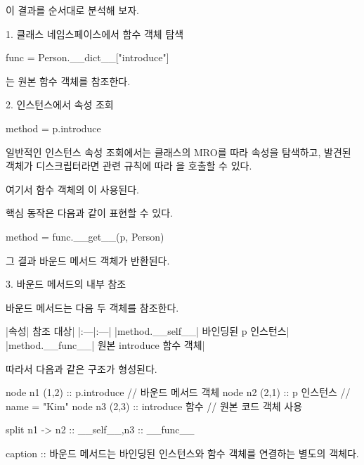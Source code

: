 이 결과를 순서대로 분석해 보자.

\begin{dhknote}
\begin{dhksmry}[centered]
1. 클래스 네임스페이스에서 함수 객체 탐색
\end{dhksmry}
\end{dhknote}

\begin{dhkcode}
func = Person.__dict__["introduce"]
\end{dhkcode}

는 원본 함수 객체를 참조한다.

\begin{dhknote}
\begin{dhksmry}[centered]
2. 인스턴스에서 속성 조회
\end{dhksmry}
\end{dhknote}

\begin{dhkcode}
method = p.introduce
\end{dhkcode}

일반적인 인스턴스 속성 조회에서는 클래스의 MRO를 따라 속성을 탐색하고, 발견된 객체가 디스크립터라면 관련 규칙에 따라 을 호출할 수 있다.

여기서 함수 객체의 이 사용된다.

핵심 동작은 다음과 같이 표현할 수 있다.

\begin{dhkcode}
method = func.__get__(p, Person)
\end{dhkcode}

그 결과 바운드 메서드 객체가 반환된다.

\begin{dhknote}
\begin{dhksmry}[centered]
3. 바운드 메서드의 내부 참조
\end{dhksmry}
\end{dhknote}

바운드 메서드는 다음 두 객체를 참조한다.

\begin{dhktable}
|속성|	참조 대상|
|:---|:---|
|method.__self__|	바인딩된 p 인스턴스|
|method.__func__|	원본 introduce 함수 객체|
\end{dhktable}

따라서 다음과 같은 구조가 형성된다.

\begin{dhkgraph}[uniform]
node n1 (1,2) :: p.introduce // 바운드 메서드 객체
node n2 (2,1) :: p 인스턴스 // name = "Kim"
node n3 (2,3) :: introduce 함수 // 원본 코드 객체 사용

split n1 -> n2 :: __self__,n3 :: __func__

caption :: 바운드 메서드는 바인딩된 인스턴스와 함수 객체를 연결하는 별도의 객체다.
\end{dhkgraph}

